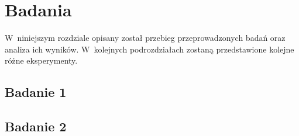 \section{Badania}
W~niniejszym rozdziale opisany został przebieg przeprowadzonych badań oraz analiza ich wyników. W~kolejnych podrozdziałach zostaną przedstawione kolejne różne eksperymenty. 

\subsection{Badanie 1}
\subsection{Badanie 2}